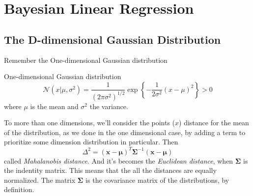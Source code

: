 \section{Bayesian Linear Regression}
\framecard{\insertsection}

\subsection{The D-dimensional Gaussian Distribution}

\begin{frame}{\insertsubsection}

	

\end{frame}

\begin{frame}{\insertsubsection}

Remember the One-dimensional Gaussian distribution
\begin{block}{One-dimensional Gaussian distribution}
\begin{equation*}
	\mathcal{N}(x | \mu, \sigma^2) = \frac{1}{(2 \pi \sigma^2)^{1/2}} \exp \left\{ -\frac{1}{2 \sigma^2} (x- \mu)^2 \right\} > 0
\end{equation*}
where $\mu$ is the mean and $\sigma^2$ the variance.
\end{block}
\end{frame}

\begin{frame}{\insertsubsection}
	To more than one dimensions, we'll consider the points ($x$) distance for the mean of the distribution, as we done in the one dimensional case, by adding a term to prioritize some dimension distribution in particular. Then
	\begin{equation*}
		\Delta^2 = (\mathbf{x} - \boldsymbol{\mu})^T \boldsymbol{\Sigma} ^{-1} (\mathbf{x} - \boldsymbol{\mu}) 
	\end{equation*}
called \textit{Mahalanobis distance}. And it's becomes the \textit{Euclidean distance}, when $\boldsymbol{\Sigma}$ is the indentity matrix. This means that the all the distances are equally normalized. The matrix $\boldsymbol{\Sigma}$ is the covariance matrix of the distributions, by definition.
\end{frame}

